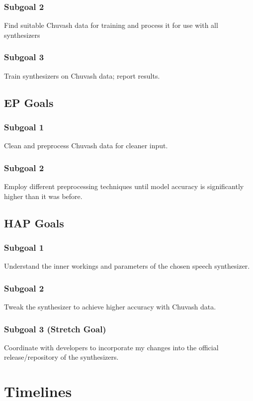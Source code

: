 \documentclass[fleqn,10pt]{SelfArx} %
\begin{document}
\subsubsection{Subgoal 2}
Find suitable Chuvash data for training and process it for use with all synthesizers
\subsubsection{Subgoal 3}
Train synthesizers on Chuvash data; report results.

\subsection{EP Goals}
\subsubsection{Subgoal 1}
Clean and preprocess Chuvash data for cleaner input.
\subsubsection{Subgoal 2}
Employ different preprocessing techniques until model accuracy is significantly higher than it was before.

\subsection{HAP Goals}
\subsubsection{Subgoal 1}
Understand the inner workings and parameters of the chosen speech synthesizer.
\subsubsection{Subgoal 2}
Tweak the synthesizer to achieve higher accuracy with Chuvash data.
\subsubsection{Subgoal 3 (Stretch Goal)}
Coordinate with developers to incorporate my changes into the official release/repository of the synthesizers.

\section{Timelines} %
\end{document}
